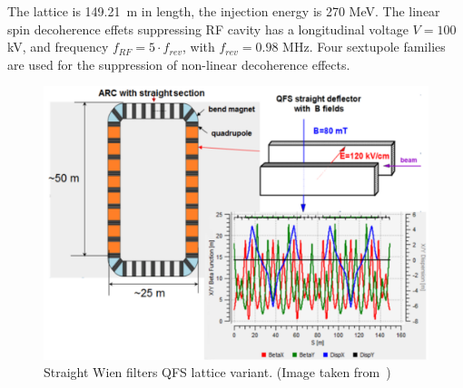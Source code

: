 The lattice is 149.21~m in length, the injection energy is 270 MeV. The linear spin decoherence effets suppressing
RF cavity has a longitudinal voltage $V = 100$ kV, and frequency $f_{RF} = 5\cdot f_{rev}$,
with $f_{rev} = 0.98$ MHz. Four sextupole families are used for the suppression of non-linear decoherence effects.
\begin{figure}[h!]
	\centering
	\includegraphics[width=\linewidth]{images/chapter2/E+B_lattice}
	\caption{Straight Wien filters QFS lattice variant.
          (Image taken from~\cite{Senichev:Lattices})\label{fig:QFS_E+B_lattice}}
\end{figure}

